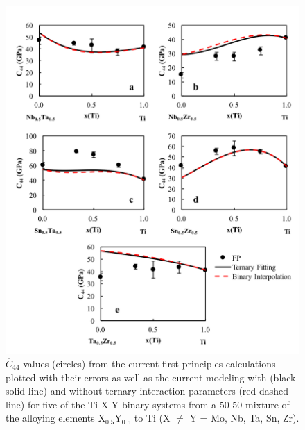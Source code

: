 \pagebreak
\begin{figure}[H]
	\centering
	\includegraphics[width=\textwidth]{Chapter-6/Figures/tixyc442.png}
	\caption{$\overline{C}_{44}$ values (circles) from the current first-principles calculations plotted with their errors as well as the current modeling with (black solid line) and without ternary interaction parameters (red dashed line) for five of the Ti-X-Y binary systems from a 50-50 mixture of the alloying elements X$_{0.5}$Y$_{0.5}$ to Ti (X $\neq$ Y = Mo, Nb, Ta, Sn, Zr).}
	\label{Ch6-figure:tixyc44_2}
\end{figure}

